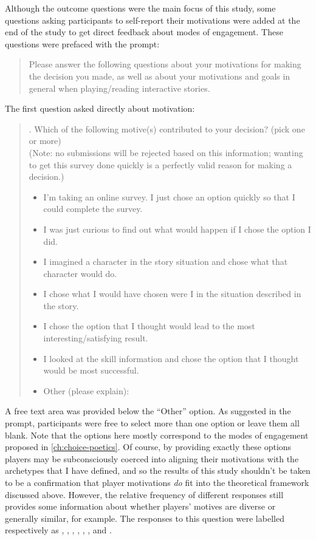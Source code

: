 Although the outcome questions were the main focus of this study, some questions asking participants to self-report their motivations were added at the end of the study to get direct feedback about modes of engagement.
%
These questions were prefaced with the prompt:
%
\begin{quote}
  \quoteshape
Please answer the following questions about your motivations for making the decision you made, as well as about your motivations and goals in general when playing/reading interactive stories.
\end{quote}
%
The first question asked directly about motivation:
%
\begin{quote}
  . Which of the following motive(s) contributed to your decision? (pick one or more) \\
  (Note: no submissions will be rejected based on this information; wanting to get this survey done quickly is a perfectly valid reason for making a decision.) \\
  \begin{itemize}
    \item[\ding{111}] I'm taking an online survey. I just chose an option quickly so that I could complete the survey.
    \item[\ding{111}] I was just curious to find out what would happen if I chose the option I did.
    \item[\ding{111}] I imagined a character in the story situation and chose what that character would do.
    \item[\ding{111}] I chose what I would have chosen were I in the situation described in the story.
    \item[\ding{111}] I chose the option that I thought would lead to the most interesting/satisfying result.
    \item[\ding{111}] I looked at the skill information and chose the option that I thought would be most successful.
    \item[\ding{111}] Other (please explain):
  \end{itemize}
\end{quote}
%
A free text area was provided below the ``Other'' option.
%
As suggested in the prompt, participants were free to select more than one option or leave them all blank.
%
Note that the options here mostly correspond to the modes of engagement proposed in \cref{ch:choice-poetics}.
%
Of course, by providing exactly these options players may be subconsciously coerced into aligning their motivations with the archetypes that I have defined, and so the results of this study shouldn't be taken to be a confirmation that player motivations \emph{do} fit into the theoretical framework discussed above.
%
However, the relative frequency of different responses still provides some information about whether players' motives are diverse or generally similar, for example.
%
The responses to this question were labelled respectively as , , , , , , and .

